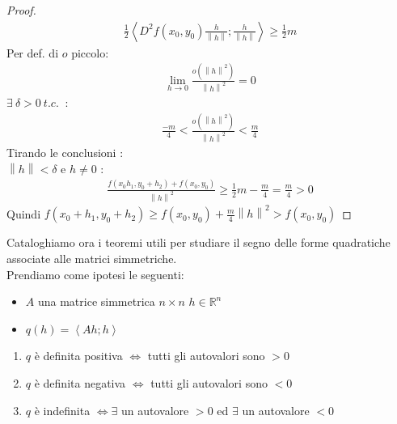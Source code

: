 \documentclass[a4paper, oneside]{article}
\begin{document}
\begin{proof}
            \begin{gather*}
                \frac{1}{2}\left\langle D^2f(x_0,y_0) \frac{h}{\left\lVert h\right\rVert }; \frac{h}{\left\lVert h\right\rVert }\right\rangle \geq \frac{1}{2}m
            \end{gather*}
            Per def. di $o$ piccolo:
            \begin{gather*}
                \lim_{h \to 0} \frac{o(\left\lVert h\right\rVert^2 )}{\left\lVert h\right\rVert^2 } = 0
            \end{gather*}
             $\exists \ \delta > 0 \ t.c. \ $  :\\
            \begin{gather*}
                \frac{-m}{4}< \frac{o(\left\lVert h\right\rVert^2 )}{\left\lVert h\right\rVert^2 } < \frac{m}{4}
            \end{gather*}
            Tirando le conclusioni :\\
             $\left\lVert h\right\rVert < \delta$ e $h \neq 0 $ :
            \begin{gather*}
                \frac{f(x_0h_1,y_0+h_2)+f(x_0,y_0)}{\left\lVert h\right\rVert^2 } \geq \frac{1}{2}m - \frac{m}{4} = \frac{m}{4} > 0
            \end{gather*}
            Quindi $f(x_0+h_1,y_0+h_2) \geq f(x_0,y_0) + \frac{m}{4} \left\lVert h\right\rVert^2 > f(x_0,y_0)$ 
        \end{proof}


        \begin{proposition}
            Cataloghiamo ora i teoremi utili per studiare il segno delle forme quadratiche associate alle matrici simmetriche.\\
            Prendiamo come ipotesi le seguenti:
            \begin{itemize}
                \item {} $A$ una matrice simmetrica $n \times n$  $h \in \mathbb{R}^n$\\
                \item {} $q(h) = \left\langle Ah;h \right\rangle$ 
            \end{itemize}
        \end{proposition}


        \begin{theorem}
            \begin{enumerate}[$i)$]
                \item $q$ è definita positiva $\Leftrightarrow$ tutti gli autovalori sono $>0$
                \item $q$ è definita negativa $\Leftrightarrow$ tutti gli autovalori sono $<0$
                \item $q$ è indefinita $\Leftrightarrow \exists$ un autovalore $>0$ ed $\exists$ un autovalore $<0$
            \end{enumerate}
        \end{theorem}
\end{document}
